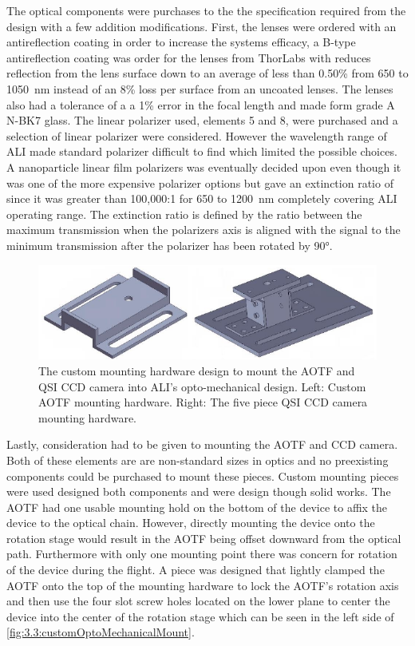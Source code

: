 The optical components were purchases to the the specification required from the design with a few addition modifications. First, the lenses were ordered with an antireflection coating in order to increase the systems efficacy, a B-type antireflection coating was order for the lenses from ThorLabs with reduces reflection from the lens surface down to an average of less than 0.50\% from 650 to 1050~nm instead of an 8\% loss per surface from an uncoated lenses. The lenses also had a tolerance of a a 1\% error in the focal length and made form grade A N-BK7 glass. The linear polarizer used, elements 5 and 8, were purchased and a selection of linear polarizer were considered. However the wavelength range of ALI made standard polarizer difficult to find which limited the possible choices. A nanoparticle linear film polarizers was eventually decided upon even though it was one of the more expensive polarizer options but gave an extinction ratio of since it was greater than 100,000:1 for 650 to 1200~nm completely covering ALI operating range. The extinction ratio is defined by the ratio between the maximum transmission when the polarizers axis is aligned with the signal to the minimum transmission after the polarizer has been rotated by 90\si{\degree}.

\begin{figure}[h!]
        \includegraphics[width=1.0\textwidth]{./Images/3-3-CustomMountingPieces.pdf}
        \caption[ALI Custom Mounting Hardware]{The custom mounting hardware design to mount the AOTF and QSI CCD camera into ALI's opto-mechanical design. Left: Custom AOTF mounting hardware. Right: The five piece QSI CCD camera mounting hardware.}
        \label{fig:3.3:customOptoMechanicalMount}
\end{figure}

Lastly, consideration had to be given to mounting the AOTF and CCD camera. Both of these elements are are non-standard sizes in optics and no preexisting components could be purchased to mount these pieces. Custom mounting pieces were used designed both components and were design though solid works. The AOTF had one usable mounting hold on the bottom of the device to affix the device to the optical chain. However, directly mounting the device onto the rotation stage would result in the AOTF being offset downward from the optical path. Furthermore with only one mounting point there was concern for rotation of the device during the flight. A piece was designed that lightly clamped the AOTF onto the top of the mounting hardware to lock the AOTF's rotation axis and then use the four slot screw holes located on the lower plane to center the device into the center of the rotation stage which can be seen in the left side of \autoref{fig:3.3:customOptoMechanicalMount}.

